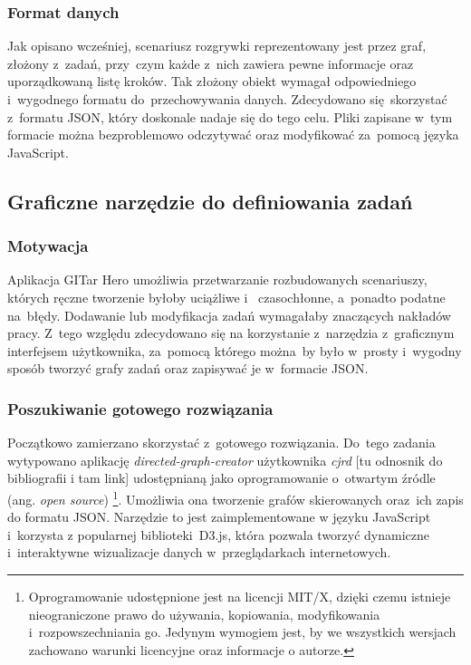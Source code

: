 \documentclass[12pt,a4paper,polish,thesis]{dcsbook}
\begin{document}
{	\subsubsection{Format danych}

	Jak opisano wcześniej, scenariusz rozgrywki reprezentowany jest przez graf, złożony z~zadań, przy~czym każde z~nich zawiera pewne informacje oraz uporządkowaną listę kroków. Tak złożony obiekt wymagał odpowiedniego i~wygodnego formatu do~przechowywania danych. Zdecydowano się~skorzystać z~formatu JSON, który doskonale nadaje się do tego celu. Pliki zapisane w~tym formacie można bezproblemowo odczytywać oraz modyfikować za~pomocą języka JavaScript.

	\subsection{Graficzne narzędzie do definiowania zadań}

	\subsubsection{Motywacja}

	Aplikacja GITar Hero umożliwia przetwarzanie rozbudowanych scenariuszy, których ręczne tworzenie byłoby uciążliwe i ~czasochłonne, a~ponadto podatne na~błędy. Dodawanie lub modyfikacja zadań wymagałaby znaczących nakładów pracy.
	Z~tego względu zdecydowano się na korzystanie z~narzędzia z~graficznym interfejsem użytkownika, za~pomocą którego można~by było w~prosty i~wygodny sposób tworzyć grafy zadań oraz zapisywać je w~formacie JSON.

	\subsubsection{Poszukiwanie gotowego rozwiązania} \label{solution}

	Początkowo zamierzano skorzystać z~gotowego rozwiązania. Do~tego zadania wytypowano aplikację \textit{directed-graph-creator} użytkownika \textit{cjrd} [tu odnosnik do bibliografii i tam link] udostępnianą jako oprogramowanie o~otwartym źródle (ang. \textit{open source}) \footnote{Oprogramowanie udostępnione jest na licencji MIT/X, dzięki czemu istnieje nieograniczone prawo do używania, kopiowania, modyfikowania i~rozpowszechniania go. Jedynym wymogiem jest, by we wszystkich wersjach zachowano warunki licencyjne oraz informacje o autorze.}. Umożliwia ona tworzenie grafów skierowanych oraz~ich zapis do formatu JSON. Narzędzie to jest zaimplementowane w języku JavaScript i~korzysta z popularnej biblioteki~D3.js, która pozwala tworzyć dynamiczne i~interaktywne wizualizacje danych w~przeglądarkach internetowych.

}
\end{document}
